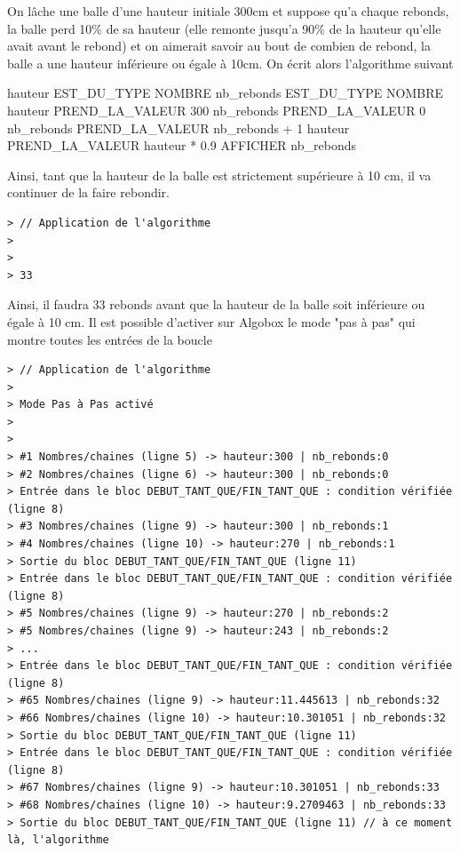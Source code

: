 \begin{exemple}
On lâche une balle d'une hauteur initiale 300cm et suppose qu'a chaque rebonds, la balle perd 10\% de sa hauteur (elle remonte jusqu'a 90\% de la hauteur qu'elle avait avant le rebond) et on aimerait savoir au bout de combien de rebond, la balle a une hauteur inférieure ou égale à 10cm. On écrit alors l'algorithme suivant
\begin{algobox}
\Variables
\Ligne hauteur EST\_DU\_TYPE NOMBRE
\Ligne nb\_rebonds EST\_DU\_TYPE NOMBRE
\DebutAlgo
\Ligne hauteur PREND\_LA\_VALEUR 300
\Ligne nb\_rebonds PREND\_LA\_VALEUR 0
\DebutTantQue
\Ligne nb\_rebonds PREND\_LA\_VALEUR nb\_rebonds + 1
\Ligne hauteur PREND\_LA\_VALEUR hauteur * 0.9
\FinTantQue
\Ligne AFFICHER nb\_rebonds
\FinAlgo
\end{algobox}
Ainsi, tant que la hauteur de la balle est strictement supérieure à 10 cm, il va continuer de la faire rebondir.
\begin{verbatim}
> // Application de l'algorithme
>
> 
> 33
\end{verbatim}
Ainsi, il faudra 33 rebonds avant que la hauteur de la balle soit inférieure ou égale à 10 cm. Il est possible d'activer sur Algobox le mode "pas à pas" qui montre toutes les entrées de la boucle
\begin{verbatim}
> // Application de l'algorithme
>
> Mode Pas à Pas activé
> 
>
> #1 Nombres/chaines (ligne 5) -> hauteur:300 | nb_rebonds:0 
> #2 Nombres/chaines (ligne 6) -> hauteur:300 | nb_rebonds:0 
> Entrée dans le bloc DEBUT_TANT_QUE/FIN_TANT_QUE : condition vérifiée (ligne 8)
> #3 Nombres/chaines (ligne 9) -> hauteur:300 | nb_rebonds:1 
> #4 Nombres/chaines (ligne 10) -> hauteur:270 | nb_rebonds:1 
> Sortie du bloc DEBUT_TANT_QUE/FIN_TANT_QUE (ligne 11)
> Entrée dans le bloc DEBUT_TANT_QUE/FIN_TANT_QUE : condition vérifiée (ligne 8)
> #5 Nombres/chaines (ligne 9) -> hauteur:270 | nb_rebonds:2 
> #5 Nombres/chaines (ligne 9) -> hauteur:243 | nb_rebonds:2 
> ...
> Entrée dans le bloc DEBUT_TANT_QUE/FIN_TANT_QUE : condition vérifiée (ligne 8)
> #65 Nombres/chaines (ligne 9) -> hauteur:11.445613 | nb_rebonds:32 
> #66 Nombres/chaines (ligne 10) -> hauteur:10.301051 | nb_rebonds:32 
> Sortie du bloc DEBUT_TANT_QUE/FIN_TANT_QUE (ligne 11)
> Entrée dans le bloc DEBUT_TANT_QUE/FIN_TANT_QUE : condition vérifiée (ligne 8)
> #67 Nombres/chaines (ligne 9) -> hauteur:10.301051 | nb_rebonds:33 
> #68 Nombres/chaines (ligne 10) -> hauteur:9.2709463 | nb_rebonds:33 
> Sortie du bloc DEBUT_TANT_QUE/FIN_TANT_QUE (ligne 11) // à ce moment là, l'algorithme 

\end{verbatim}
\end{exemple}
